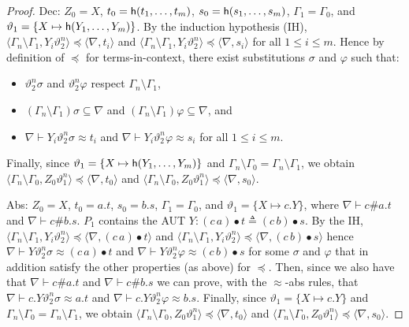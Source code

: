 \documentclass{llncs}
\newcommand{\swap}[2]{\ensuremath{(#1\, #2)}}
\newcommand{\permef}{\bullet}
\newcommand\nomh{{\sf h}}
\newcommand{\np}[2]{\langle #1, \allowbreak #2\rangle}
\begin{document}
\begin{proof}
{\sf Dec:} $Z_0=X$, $t_0=\nomh(t_1,\ldots,t_m)$,
$s_0=\nomh(s_1,\ldots,s_m)$, $\Gamma_1=\Gamma_0$, and
$\vartheta_1=\{X\mapsto \nomh(Y_1,\ldots,Y_m)\}$. By the induction
hypothesis (IH), $\np{\Gamma_n\setminus
  \Gamma_1}{Y_i\vartheta_2^n}\preceq \np{\nabla}{t_i}$ and
$\np{\Gamma_n\setminus \Gamma_1}{Y_i\vartheta_2^n}\preceq
\np{\nabla}{s_i}$ for all $1\le i \le m$.  
Hence by definition of $\preceq$ for terms-in-context,
  there exist substitutions $\sigma$ and $\varphi$ such that:
\begin{itemize}
\item $\vartheta_2^n\sigma$  and $\vartheta_2^n\varphi$ respect
  $\Gamma_n\setminus \Gamma_1$,
\item  $(\Gamma_n\setminus
  \Gamma_1)\sigma\subseteq\nabla$ and $(\Gamma_n\setminus
  \Gamma_1)\varphi\subseteq\nabla$, and
\item  $\nabla \vdash
  Y_i\vartheta_2^n\sigma \approx t_i$ and $\nabla \vdash
  Y_i\vartheta_2^n\varphi \approx s_i$ for all $1\le i \le m$.
\end{itemize}
 Finally, since $\vartheta_1=\{X\mapsto \nomh(Y_1,\ldots,Y_m)\}$ and 
$\Gamma_n\setminus \Gamma_0=\Gamma_n\setminus \Gamma_1$, we obtain
$\np{\Gamma_n\setminus \Gamma_0}{Z_0\vartheta_1^n}\preceq
\np{\nabla}{t_0}$ and $\np{\Gamma_n\setminus
  \Gamma_0}{Z_0\vartheta_1^n}\preceq \np{\nabla}{s_0}$. \vspace{0.3cm}


{\sf Abs:} $Z_0=X$, $t_0= a.t$, $s_0=b.s$, $\Gamma_1=\Gamma_0$, and
$\vartheta_1=\{X\mapsto c.Y\}$, where $ \nabla \vdash c\# a.t$ and $
\nabla \vdash c\# b.s$. $P_1$ contains the AUT $Y: \swap{c}{a}\permef t
\triangleq \swap{c}{b}\permef s$. By the IH, 
$\np{\Gamma_n\setminus
  \Gamma_1}{Y_i\vartheta_2^n}\preceq \np{\nabla}{\swap{c}{a}\permef t}$ and
$\np{\Gamma_n\setminus \Gamma_1}{Y_i\vartheta_2^n}\preceq
\np{\nabla}{\swap{c}{b}\permef s}$
 hence $\nabla \vdash
Y\vartheta_2^n\sigma \approx \swap{c}{a}\permef t$ and $\nabla \vdash
Y\vartheta_2^n\varphi \approx \swap{c}{b}\permef s$ for some $\sigma$ and
$\varphi$ that in addition satisfy the other properties (as above) for $\preceq$. Then, since we also have that $ \nabla \vdash c\# a.t$ and $
\nabla \vdash c\# b.s$ we can prove, with the $\approx$-abs rules, that $\nabla \vdash c.Y\vartheta_2^n\sigma \approx a.t$ and $\nabla
\vdash c.Y\vartheta_2^n\varphi \approx b.s$.
 Finally, since $\vartheta_1=\{X\mapsto c.Y\}$ and
$\Gamma_n\setminus \Gamma_0=\Gamma_n\setminus \Gamma_1$, we obtain
$\np{\Gamma_n\setminus \Gamma_0}{Z_0\vartheta_1^n}\preceq
\np{\nabla}{t_0}$ and $\np{\Gamma_n\setminus
  \Gamma_0}{Z_0\vartheta_1^n}\preceq \np{\nabla}{s_0}$.\vspace{0.3cm}



\end{proof}
\end{document}
